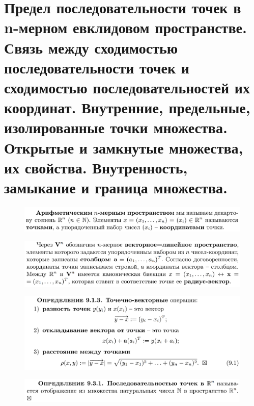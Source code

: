 \documentclass{article}
\date{}
\begin{document}
\noindent

\tableofcontents

\newpage
\section{\color{RedViolet}\textbf{Предел последовательности точек в n-мерном евклидовом пространстве. Связь между сходимостью последовательности точек и сходимостью последовательностей их координат. Внутренние, предельные, изолированные точки множества. Открытые и замкнутые множества, их свойства. Внутренность, замыкание и граница множества.}}
\vspace{-0.5cm}
\begin{figure}[h!]
    \centering
    \includegraphics[width=\textwidth]{1.png}
    \vspace{-1cm}
\end{figure}
\begin{figure}[h!]
    \centering
    \includegraphics[width=\textwidth]{12.png}
    \vspace{-1cm}
\end{figure}
\begin{figure}[h!]
    \centering
    \includegraphics[width=\textwidth]{11.png}
    \vspace{-1cm}
\end{figure}
\begin{figure}[h!]
    \centering
    \includegraphics[width=\textwidth]{2.png}
    \vspace{-1cm}
\end{figure}
\end{document}
